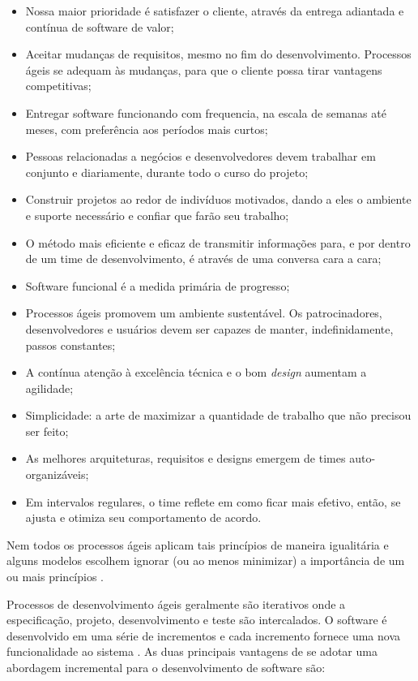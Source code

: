\begin{itemize}
    \item Nossa maior prioridade é satisfazer o cliente, através da entrega adiantada e contínua de software de valor;
    \item Aceitar mudanças de requisitos, mesmo no fim do desenvolvimento. Processos ágeis se adequam às mudanças, para que o cliente possa tirar vantagens competitivas;
    \item Entregar software funcionando com frequencia, na escala de semanas até meses, com preferência aos períodos mais curtos;
    \item Pessoas relacionadas a negócios e desenvolvedores devem trabalhar em conjunto e diariamente, durante todo o curso do projeto;
    \item Construir projetos ao redor de indivíduos motivados, dando a eles o ambiente e suporte necessário e confiar que farão seu trabalho;
    \item O método mais eficiente e eficaz de transmitir informações para, e por dentro de um time de desenvolvimento, é através de uma conversa cara a cara;
    \item Software funcional é a medida primária de progresso;
    \item Processos ágeis promovem um ambiente sustentável. Os patrocinadores, desenvolvedores e usuários devem ser capazes de manter, indefinidamente, passos constantes;
    \item A contínua atenção à excelência técnica e o bom \textit{design} aumentam a agilidade;
    \item Simplicidade: a arte de maximizar a quantidade de trabalho que não precisou ser feito;
    \item As melhores arquiteturas, requisitos e designs emergem de times auto-organizáveis;
    \item Em intervalos regulares, o time reflete em como ficar mais efetivo, então, se ajusta e otimiza seu comportamento de acordo.
\end{itemize}

Nem todos os processos ágeis aplicam tais princípios de maneira igualitária e alguns modelos escolhem ignorar (ou ao menos minimizar) a importância de um ou mais princípios \cite{pressman_2009}.

Processos de desenvolvimento ágeis geralmente são iterativos onde a
especificação, projeto, desenvolvimento e teste são intercalados. O software é desenvolvido
em uma série de incrementos e cada incremento fornece uma nova funcionalidade ao sistema \cite{sommerville_2006}. As duas principais
vantagens de se adotar uma abordagem incremental para o desenvolvimento de software são:

